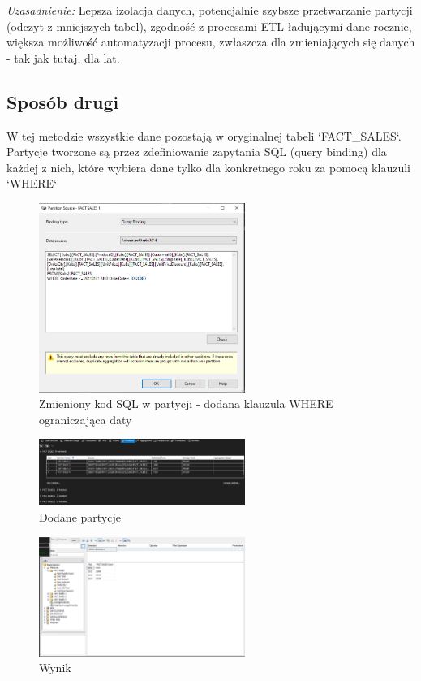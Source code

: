 \documentclass[a4paper,12pt]{article}
\begin{document}
\textit{Uzasadnienie:} Lepsza izolacja danych, potencjalnie szybsze przetwarzanie partycji (odczyt z mniejszych tabel), zgodność z procesami ETL ładującymi dane rocznie, większa możliwość automatyzacji procesu, zwłaszcza dla zmieniających się danych - tak jak tutaj, dla lat.

\subsection{Sposób drugi}

W tej metodzie wszystkie dane pozostają w oryginalnej tabeli `FACT\_SALES`. Partycje tworzone są przez zdefiniowanie
zapytania SQL (query binding) dla każdej z nich, które wybiera dane tylko dla konkretnego roku za pomocą klauzuli `WHERE`

\begin{figure}[H]
  \includegraphics[width=0.6\textwidth]{images/4b_source.png}
  \caption{Zmieniony kod SQL w partycji - dodana klauzula WHERE ograniczająca daty}
\end{figure}

\begin{figure}[H]
  \includegraphics[width=0.6\textwidth]{images/4b.png}
  \caption{Dodane partycje}
\end{figure}

\begin{figure}[H]
  \includegraphics[width=0.6\textwidth]{images/4a_result.png}
  \caption{Wynik}
\end{figure}
\end{document}
